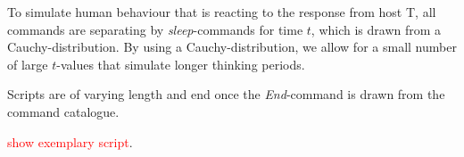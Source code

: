 \documentclass[conference]{IEEEtran}\usepackage[]{graphicx}\usepackage[]{color}
\begin{document}
To simulate human behaviour that is reacting to the response from host T, all commands are separating by \textit{sleep}-commands for time $t$, which is drawn from a Cauchy-distribution. By using a Cauchy-distribution, we allow for a small number of large $t$-values that simulate longer thinking periods.  


Scripts are of varying length and end once the \textit{End}-command is drawn from the command catalogue. 

\textcolor{red}{show exemplary script}.


\end{document}
